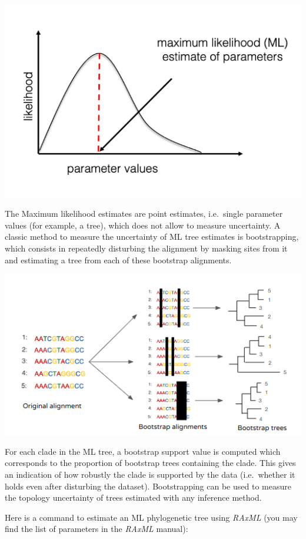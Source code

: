 \documentclass[
  letterpaper,
]{book}
\begin{document}
\includegraphics{assets/images/chapters/phylogenomics/21.png}

The Maximum likelihood estimates are point estimates, i.e.~single
parameter values (for example, a tree), which does not allow to measure
uncertainty. A classic method to measure the uncertainty of ML tree
estimates is bootstrapping, which consists in repeatedly disturbing the
alignment by masking sites from it and estimating a tree from each of
these bootstrap alignments.

\includegraphics{assets/images/chapters/phylogenomics/22.png}

For each clade in the ML tree, a bootstrap support value is computed
which corresponds to the proportion of bootstrap trees containing the
clade. This gives an indication of how robustly the clade is supported
by the data (i.e.~whether it holds even after disturbing the dataset).
Bootstrapping can be used to measure the topology uncertainty of trees
estimated with any inference method.

Here is a command to estimate an ML phylogenetic tree using \emph{RAxML}
(you may find the list of parameters in the \emph{RAxML} manual):
\end{document}
